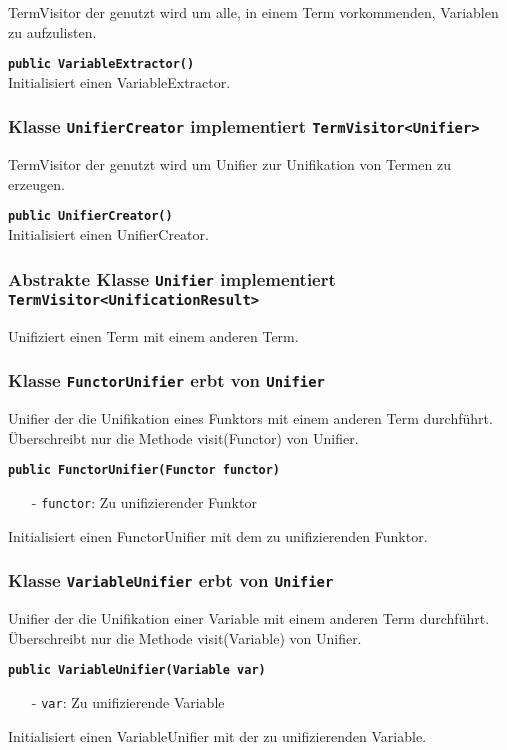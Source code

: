 \documentclass[parskip=full,11pt,twoside]{scrartcl}
\begin{document}
TermVisitor der genutzt wird um alle, in einem Term vorkommenden, Variablen zu aufzulisten.

\textbf{\texttt{public VariableExtractor()}}\\
Initialisiert einen VariableExtractor.

\subsubsection{Klasse \texttt{UnifierCreator} implementiert \texttt{TermVisitor<Unifier>}}

TermVisitor der genutzt wird um Unifier zur Unifikation von Termen zu erzeugen.

\textbf{\texttt{public UnifierCreator()}}\\
Initialisiert einen UnifierCreator.

\subsubsection{Abstrakte Klasse \texttt{Unifier} implementiert \texttt{TermVisitor<UnificationResult>}}

Unifiziert einen Term mit einem anderen Term.

\subsubsection{Klasse \texttt{FunctorUnifier} erbt von \texttt{Unifier}}
Unifier der die Unifikation eines Funktors mit einem anderen Term durchführt. Überschreibt nur die Methode visit(Functor) von Unifier.

\textbf{\texttt{public FunctorUnifier(Functor functor)}}
\begin{itemize}[noitemsep]
	\item[-] \texttt{functor}: Zu unifizierender Funktor
\end{itemize}
Initialisiert einen FunctorUnifier mit dem zu unifizierenden Funktor.

\subsubsection{Klasse \texttt{VariableUnifier} erbt von \texttt{Unifier}}
Unifier der die Unifikation einer Variable mit einem anderen Term durchführt. Überschreibt nur die Methode visit(Variable) von Unifier.

\textbf{\texttt{public VariableUnifier(Variable var)}}
\begin{itemize}[noitemsep]
	\item[-] \texttt{var}: Zu unifizierende Variable
\end{itemize}
Initialisiert einen VariableUnifier mit der zu unifizierenden Variable.
\end{document}
